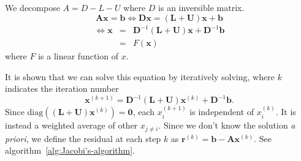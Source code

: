 We decompose $A=D-L-U$ where $D$ is an inversible matrix.
\begin{equation}
\bm{A}\bm{x}=\bm{b}\Leftrightarrow\bm{D}\bm{x}=\left(\bm{L}+\bm{U}\right)\bm{x}+\bm{b}
\end{equation}
\begin{eqnarray}
\Leftrightarrow\bm{x} & = & \bm{D}^{-1}\left(\bm{L}+\bm{U}\right)\bm{x}+\bm{D}^{-1}\bm{b}\\
 & = & F\left(\bm{x}\right)
\end{eqnarray}
where $F$ is a linear function of $x$.

It is shown that we can solve this equation by iteratively solving,
where $k$ indicates the iteration number
\begin{equation}
\bm{x}^{\left(k+1\right)}=\bm{D}^{-1}\left(\bm{L}+\bm{U}\right)\bm{x}^{\left(k\right)}+\bm{D}^{-1}\bm{b}.
\end{equation}
Since $\mbox{diag}\left(\left(\bm{L}+\bm{U}\right)\bm{x}^{\left(k\right)}\right)=\bm{0}$,
each $x_{i}^{\left(k+1\right)}$ is independent of $x_{i}^{\left(k\right)}$.
It is instead a weighted average of other $x_{j\neq i}$. Since we
don't know the solution \emph{a priori}, we define the residual at
each step $k$ as $\bm{r}^{\left(k\right)}=\bm{b}-\bm{A}\bm{x}^{\left(k\right)}$.
See algorithm~\ref{alg:Jacobi's-algorithm}.

